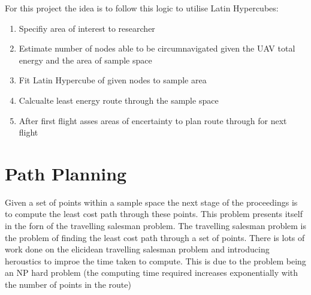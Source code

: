\documentclass[a4paper,12pt,twoside]{article}
\begin{document}
For this project the idea is to follow this logic to utilise Latin Hypercubes:

\begin{enumerate}
\item Specifiy area of interest to researcher
\item Estimate number of nodes able to be circumnavigated given the UAV total energy and the area of sample space
\item Fit Latin Hypercube of given nodes to sample area
\item Calcualte least energy route through the sample space
\item After first flight asses areas of encertainty to plan route through for next flight

\end{enumerate}

\section{Path Planning}
\label{sec:path_planning}

Given a set of points within a sample space the next stage of the proceedings is to compute the least cost path through these points. This problem presents itself in the forn of the travelling salesman problem. The travelling salesman problem is the problem of finding the least cost path through a set of points. There is lots of work done on the elicidean travelling salesman problem and introducing heroustics to improe the time taken to compute. This is due to the problem being an NP hard problem (the computing time required increases exponentially with the number of points in the route)
\end{document}
